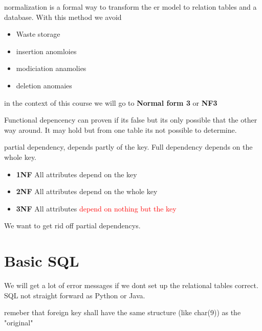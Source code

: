 
normalization is a formal way to transform the er model to relation tables and a database. With this method we avoid 
\begin{itemize}
	\item Waste storage
	\item insertion anomloies
	\item modiciation anamolies
	\item deletion anomaies
\end{itemize}

in the context of this course we will go to \textbf{Normal form 3} or \textbf{NF3} 

Functional depencency can proven if its false but its only possible that the other way around. It may hold but from one table its not possible to determine. 

partial dependency, depends partly of the key. Full dependency depends on the whole key. 

\begin{itemize}
	\item \textbf{1NF} All attributes depend on the key
	\item \textbf{2NF} All attributes depend on the whole key
	\item \textbf{3NF} All attributes \textcolor{red}{depend on nothing but the key} 
\end{itemize}

We want to get rid off partial dependencys. 

\section{Basic SQL}
We will get a lot of error messages if we dont set up the relational tables correct. SQL not straight forward as Python or Java. 

remeber that foreign key shall have the same structure (like char(9)) as the "original"
